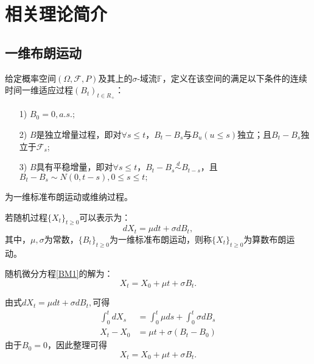 \chapter{相关理论简介}

\section{一维布朗运动}
\begin{Definition}[一维标准布朗运动]
	给定概率空间$(\Omega,\mathcal{F},P)$及其上的$\sigma$-域流$\mathbb{F}$，定义在该空间的满足以下条件的连续时间一维适应过程$(B_t)_{t \in R_+}$：
	\begin{enumerate}[fullwidth, itemindent = 0em]
		\item[1)] $B_0 = 0,a.s.;$
		\item[2)] $B$是独立增量过程，即对$\forall s \le t$，$B_t-B_s$与$B_u(u\le s)$独立；且$B_t-B_s$独立于$\mathcal{F}_s$;
		\item[3)] $B$具有平稳增量，即对$\forall s \le t$，$B_t-B_s\stackrel{d}{\sim}B_{t-s}$，且$B_t-B_s\sim N(0,t-s),0\le s \le t;$
	\end{enumerate}
	为一维标准布朗运动或维纳过程。
\end{Definition}

\begin{Definition}[算数布朗运动]
	若随机过程$\{X_t\}_{t\ge0}$可以表示为：
	\begin{equation}
		\label{BM1}
		dX_t =\mu dt+\sigma dB_t,
	\end{equation}
	其中，$\mu,\sigma$为常数，$\{B_t\}_{t \ge 0 }$为一维标准布朗运动，则称$\{X_t\}_{t\ge0}$为算数布朗运动。
\end{Definition}
随机微分方程\ref{BM1}的解为：
$$X_t = X_0 + \mu t+\sigma B_t.$$
\begin{Proof}
	由式$dX_t =\mu dt+\sigma dB_t,$可得
	\begin{align}
		\int_0^t dX_s &  =\int_0^t \mu ds+\int_0^t \sigma dB_s \nonumber\\
		X_t-X_0 & = \mu t+\sigma(B_t-B_0) \nonumber
	\end{align}
	由于$B_0 = 0$，因此整理可得
	$$X_t  = X_0 + \mu t+\sigma B_t .$$
\end{Proof}


